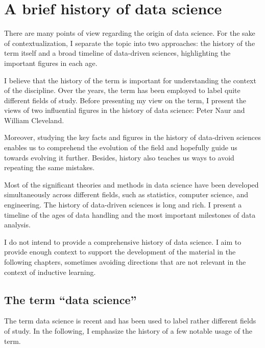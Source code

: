 \chapter{A brief history of data science}
\label{chap:history}

There are many points of view regarding the origin of data science.  For the sake of
contextualization, I separate the topic into two approaches: the history of the term itself
and a broad timeline of data-driven sciences, highlighting the important figures in each
age.

I believe that the history of the term is important for understanding the context of the
discipline. Over the years, the term has been employed to label quite different fields of
study.  Before presenting my view on the term, I present the views of two influential
figures in the history of data science: Peter Naur and William Cleveland.

Moreover, studying the key facts and figures in the history of data-driven sciences
enables us to comprehend the evolution of the field and hopefully guide us towards evolving it
further.  Besides, history also teaches us ways to avoid repeating the same mistakes.

Most of the significant theories and methods in data science have been developed
simultaneously across different fields, such as statistics, computer science, and engineering.
The history of data-driven sciences is long and rich. I present a timeline of the ages of
data handling and the most important milestones of data analysis.

I do not intend to provide a comprehensive history of data science.  I aim to provide
enough context to support the development of the material in the following chapters,
sometimes avoiding directions that are not relevant in the context of inductive learning.

\section{The term ``data science''}

The term data science is recent and has been used to label rather different fields of
study.  In the following, I emphasize the history of a few notable usage of the term.

\def\naurds{(0,0) circle (20mm)}
\def\naurcs{(0:5mm) circle (15mm)}
\def\naurde{(0:40mm) circle (15mm)}



